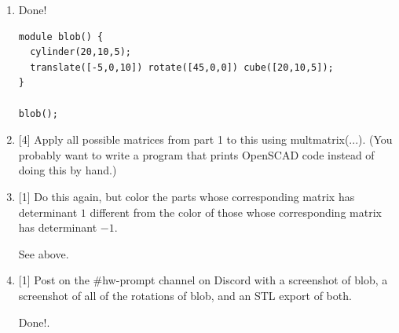 \documentclass{article}
\begin{document}
\begin{enumerate}
{\begin{proof}
            Because the index of the non-zero element of the rows of \(a\) and 
            the columns of \(b\) are unique, if \(c^i_j = a^i \cdot b_j \not= 0\), 
            all other elements of \(c\) in the same row/col of \(c^i_j\) must be 0.
            
            Therefore, the set of \(3 \times 3\) matrices that have one \(\pm 1\) 
            per row and column is closed under matrix multiplication, so, they form 
            a group \(B_3\).
        \end{proof}
    }

    \item {
        Done!

        \begin{lstlisting}
module blob() {
  cylinder(20,10,5);
  translate([-5,0,10]) rotate([45,0,0]) cube([20,10,5]);
}

blob();
        \end{lstlisting}
    }
    \item {
        [4]
      Apply all possible matrices from part 1 to this using multmatrix(...). (You probably want to write a program that prints OpenSCAD code instead of doing this by hand.)
      
      
    }
    \item {
        [1]
      Do this again, but color the parts whose corresponding matrix has determinant \(1\) different from the color of those whose corresponding matrix has determinant \(-1\).

      See above.
    }
    \item {
        [1]
      Post on the \#hw-prompt channel on Discord with a screenshot of blob, a screenshot of all of the rotations of blob, and an STL export of both.

      Done!.
    }
\end{enumerate}
\pagebreak
\end{document}
